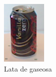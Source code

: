 \begin{figure}
	\quad
    \begin{subfigure}[b]{0.4\textwidth}
        \includegraphics[width=\textwidth]{img/base_rgbd/lata.png}
        \caption{Lata de gaseosa}
		\label{fig:lata}
    \end{subfigure}
	\quad
    \begin{subfigure}[b]{0.4\textwidth}

\end{subfigure}
\end{figure}
